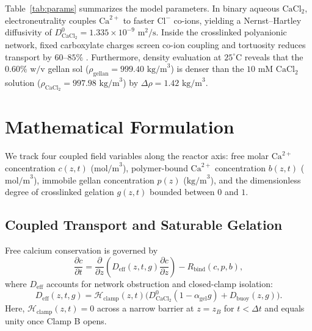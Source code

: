 \documentclass[11pt,twocolumn]{article}
\begin{document}
Table~\ref{tab:params} summarizes the model parameters. In binary aqueous $\text{CaCl}_2$, electroneutrality couples $\text{Ca}^{2+}$ to faster $\text{Cl}^-$ co-ions, yielding a Nernst--Hartley diffusivity of $D_{\text{CaCl}_2}^0 = 1.335 \times 10^{-9}\text{ m}^2/\text{s}$. Inside the crosslinked polyanionic network, fixed carboxylate charges screen co-ion coupling and tortuosity reduces transport by $60\text{--}85\%$ \cite{mammarella2003}. Furthermore, density evaluation at $25^\circ\text{C}$ reveals that the $0.60\%\text{ w/v}$ gellan sol ($\rho_{\text{gellan}} = 999.40\text{ kg/m}^3$) is denser than the $10\text{ mM CaCl}_2$ solution ($\rho_{\text{CaCl}_2} = 997.98\text{ kg/m}^3$) by $\Delta\rho = 1.42\text{ kg/m}^3$.

\section{Mathematical Formulation}
We track four coupled field variables along the reactor axis: free molar $\text{Ca}^{2+}$ concentration $c(z,t)$ ($\text{mol/m}^3$), polymer-bound $\text{Ca}^{2+}$ concentration $b(z,t)$ ($\text{mol/m}^3$), immobile gellan concentration $p(z)$ ($\text{kg/m}^3$), and the dimensionless degree of crosslinked gelation $g(z,t)$ bounded between $0$ and $1$.

\subsection{Coupled Transport and Saturable Gelation}
Free calcium conservation is governed by
\begin{equation}
\frac{\partial c}{\partial t} = \frac{\partial}{\partial z}\left(D_{\text{eff}}(z, t, g)\frac{\partial c}{\partial z}\right) - R_{\text{bind}}(c, p, b),
\label{eq:ca_transport}
\end{equation}
where $D_{\text{eff}}$ accounts for network obstruction and closed-clamp isolation:
\begin{equation}
D_{\text{eff}}(z, t, g) = \mathcal{H}_{\text{clamp}}(z, t)\Big(D_{\text{CaCl}_2}^0 (1 - \alpha_{\text{gel}} g) + D_{\text{buoy}}(z, g)\Big).
\label{eq:deff}
\end{equation}
Here, $\mathcal{H}_{\text{clamp}}(z, t) = 0$ across a narrow barrier at $z = z_B$ for $t < \Delta t$ and equals unity once Clamp B opens.
\end{document}
